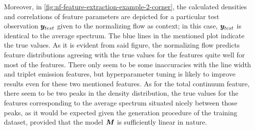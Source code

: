 \documentclass[a4paper,12pt]{report}
\begin{document}
Moreover, in \cref{fig:nf-feature-extraction-example-2-corner}, the calculated densities and correlations of feature parameters are depicted for a particular test observation $\bm{y}_{test}$ given to the normalizing flow as context; in this case, $\bm{y}_{test}$ is identical to the average spectrum. The blue lines in the mentioned plot indicate the true values. As it is evident from said figure, the normalizing flow predicts feature distributions agreeing with the true values for the features quite well for most of the features. There only seem to be some inaccuracies with the line width and triplet emission features, but hyperparameter tuning is likely to improve results even for these two mentioned features. As for the total continuum feature, there seem to be two peaks in the density distribution, the true values for the features corresponding to the average spectrum situated nicely between those peaks, as it would be expected given the generation procedure of the training dataset, provided that the model $\bm{M}$ is sufficiently linear in nature.
\end{document}
